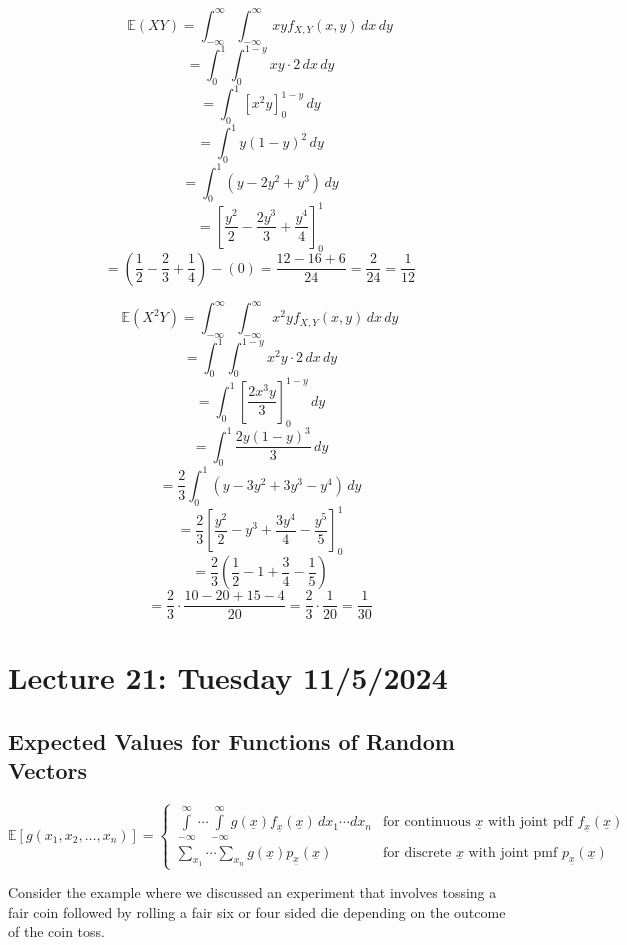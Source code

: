 \documentclass{article}
\begin{document}
   
    \[\mathbb{E}(XY) = \int_{-\infty}^{\infty} \int_{-\infty}^{\infty} xy f_{X,Y}(x,y) \, dx \, dy\]
    \[= \int_{0}^{1} \int_{0}^{1-y} xy \cdot 2 \, dx \, dy\]
    \[= \int_{0}^{1} \left[x^2y\right]_{0}^{1-y} \, dy\]
    \[= \int_{0}^{1} y(1-y)^2 \, dy\] 
    \[= \int_{0}^{1} (y-2y^2+y^3) \, dy\]
    \[= \left[\frac{y^2}{2}-\frac{2y^3}{3}+\frac{y^4}{4}\right]_{0}^{1}\]
    \[= \left(\frac{1}{2}-\frac{2}{3}+\frac{1}{4}\right) - (0) = \frac{12-16+6}{24} = \frac{2}{24} = \boxed{\frac{1}{12}}\]

    \[\mathbb{E}(X^2Y) = \int_{-\infty}^{\infty} \int_{-\infty}^{\infty} x^2y f_{X,Y}(x,y) \, dx \, dy\]
    \[= \int_{0}^{1} \int_{0}^{1-y} x^2y \cdot 2 \, dx \, dy\]
    \[= \int_{0}^{1} \left[\frac{2x^3y}{3}\right]_{0}^{1-y} \, dy\]
    \[= \int_{0}^{1} \frac{2y(1-y)^3}{3} \, dy\]
    \[= \frac{2}{3}\int_{0}^{1} (y-3y^2+3y^3-y^4) \, dy\]
    \[= \frac{2}{3}\left[\frac{y^2}{2}-y^3+\frac{3y^4}{4}-\frac{y^5}{5}\right]_{0}^{1}\]
    \[= \frac{2}{3}\left(\frac{1}{2}-1+\frac{3}{4}-\frac{1}{5}\right)\]
    \[= \frac{2}{3} \cdot \frac{10-20+15-4}{20} = \frac{2}{3} \cdot \frac{1}{20} = \boxed{\frac{1}{30}}\]

    \pagebreak

    \section*{Lecture 21: Tuesday 11/5/2024}

    \subsection*{Expected Values for Functions of Random Vectors}

    \[\mathbb{E}[g(x_1, x_2, \ldots, x_n)] = 
    \begin{cases}
        \displaystyle\int\limits_{-\infty}^{\infty} \cdots \int\limits_{-\infty}^{\infty} 
        g(\underline{x}) f_{\underline{x}}(\underline{x}) \, dx_1 \cdots dx_n 
        & \text{for continuous } \underline{x} \text{ with joint pdf } f_{\underline{x}}(\underline{x}) \\[2ex]
        \displaystyle\sum_{x_1} \cdots \sum_{x_n} 
        g(\underline{x}) p_{\underline{x}}(\underline{x})
        & \text{for discrete } \underline{x} \text{ with joint pmf } p_{\underline{x}}(\underline{x})
    \end{cases}
    \]

    Consider the example where we discussed an experiment that involves tossing a fair coin
    followed by rolling a fair six or four sided die depending on the outcome of the coin toss.
\end{document}
